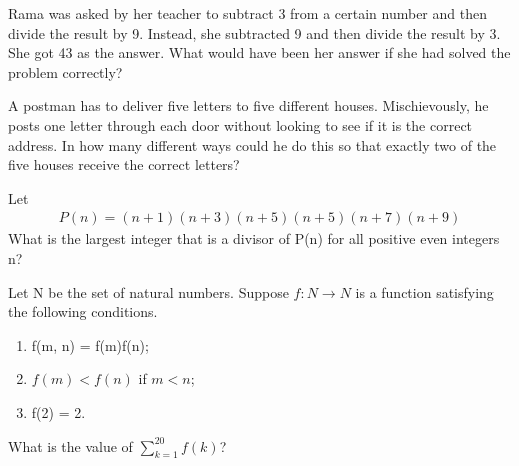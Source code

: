 \item Rama was asked by her teacher to subtract 3 from a certain number and then divide the result by 9. Instead, she subtracted 9 and then divide the result by 3. She got 43 as the answer. What would have been her answer if she had solved the problem correctly? 

\item A postman has to deliver five letters to five different houses. Mischievously, he posts one letter through each door without looking to see if it is the correct address. In how many different ways could he do this so that exactly two of the five houses receive the correct letters?

\item Let 
\begin{align*}
P(n) = (n + 1)(n + 3)(n + 5)(n + 5)(n + 7)(n + 9)
\end{align*}
What is the largest integer that is a divisor of P(n) for all positive even integers n?

\item Let N be the set of natural numbers. Suppose $f: N \rightarrow N$ is a function satisfying the following conditions.
\begin{enumerate}
\item f(m, n) = f(m)f(n);
\item $f(m) < f(n)$ if $m < n$;
\item f(2) = 2.
\end{enumerate}
What is the value of $\sum_{k = 1}^{20} f(k)$?
